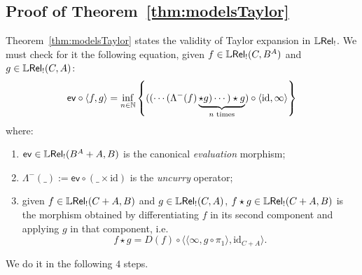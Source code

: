 

\subsection{Proof of  Theorem~\ref{thm:modelsTaylor}}

Theorem~\ref{thm:modelsTaylor} states the validity of Taylor expansion in $\mathbb{L} \mathsf{Rel}_!$.
We must check for it the following equation, given $f\in \mathbb{L} \mathsf{Rel}_!(C, B^{A})$ and $g\in \mathbb{L} \mathsf{Rel}_!(C,A)$:
$$
\mathsf{ev}\circ \langle f,g\rangle= \inf_{n\in \mathbb{N}}
\left\{(( \cdots (\Lambda^{-}(f) \underbrace{\star g)\cdots )\star g}_{n\text{ times}})\circ \langle \mathrm{id}, \infty\rangle\right\}
$$
where:
\begin{enumerate}
\item $\mathsf{ev}\in \mathbb{L} \mathsf{Rel}_!(B^{A}+A, B)$ is the canonical \emph{evaluation} morphism;

\item $\Lambda^{-}(\_):= \mathsf{ev}\circ (\_\times \mathrm{id})$ is the \emph{uncurry} operator;

\item given $f\in \mathbb{L} \mathsf{Rel}_!(C+A,B)$ and $g\in \mathbb{L} \mathsf{Rel}_!(C,A)$, 
$f\star g\in \mathbb{L} \mathsf{Rel}_!(C+A,B)$ is the morphism obtained by differentiating $f$ in its second component and applying $g$ in that component, i.e.~
$$
f\star g =  D(f)\circ \langle \langle \infty, g\circ \pi_{1}\rangle, \mathrm{id}_{C+A}\rangle.
$$ 

\end{enumerate}

We do it in the following $4$ steps.


